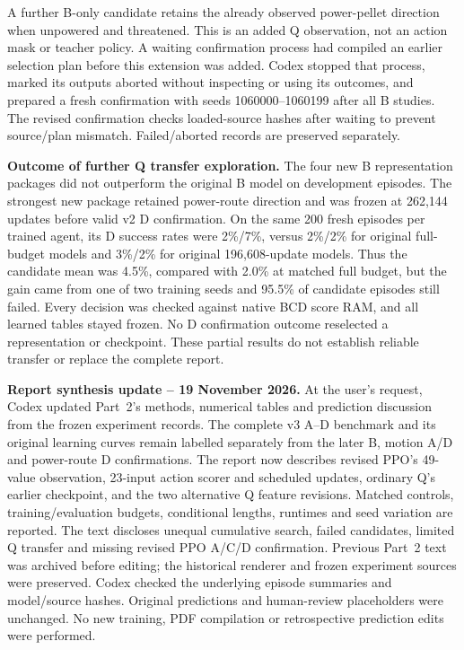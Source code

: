 A further B-only candidate retains the already observed power-pellet direction
when unpowered and threatened. This is an added Q observation, not an action
mask or teacher policy. A waiting confirmation process had compiled an earlier
selection plan before this extension was added. Codex stopped that process,
marked its outputs aborted without inspecting or using its outcomes, and
prepared a fresh confirmation with seeds 1060000--1060199 after all B studies.
The revised confirmation checks loaded-source hashes after waiting to prevent
source/plan mismatch. Failed/aborted records are preserved separately.

\medskip
\noindent\textbf{Outcome of further Q transfer exploration.}
The four new B representation packages did not outperform the original B
model on development episodes. The strongest new package retained power-route
direction and was frozen at 262,144 updates before valid v2 D confirmation.
On the same 200 fresh episodes per trained agent, its D success rates were
2\%/7\%, versus 2\%/2\% for original full-budget models and 3\%/2\% for
original 196,608-update models. Thus the candidate mean was 4.5\%, compared
with 2.0\% at matched full budget, but the gain came from one of two training
seeds and 95.5\% of candidate episodes still failed. Every decision was checked
against native BCD score RAM, and all learned tables stayed frozen. No D
confirmation outcome reselected a representation or checkpoint. These partial
results do not establish reliable transfer or replace the complete report.

\medskip
\noindent\textbf{Report synthesis update -- 19 November 2026.}
At the user's request, Codex updated Part~2's methods, numerical tables and
prediction discussion from the frozen experiment records. The complete v3
A--D benchmark and its original learning curves remain labelled separately
from the later B, motion A/D and power-route D confirmations. The report now
describes revised PPO's 49-value observation, 23-input action scorer and
scheduled updates, ordinary Q's earlier checkpoint, and the two alternative
Q feature revisions. Matched controls, training/evaluation budgets, conditional
lengths, runtimes and seed variation are reported. The text discloses unequal
cumulative search, failed candidates, limited Q transfer and missing revised
PPO A/C/D confirmation. Previous Part~2 text was archived before editing;
the historical renderer and frozen experiment sources were preserved.
Codex checked the underlying episode summaries and model/source hashes.
Original predictions and human-review placeholders were unchanged. No new
training, PDF compilation or retrospective prediction edits were performed.

